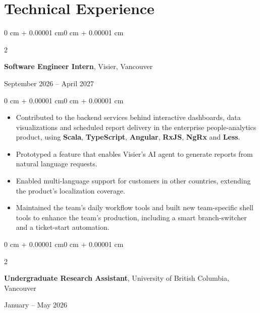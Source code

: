\documentclass[10pt, letterpaper]{article}
\newenvironment{highlights}{
    \begin{itemize}[
        topsep=0.10 cm,
        parsep=0.10 cm,
        partopsep=0pt,
        itemsep=0pt,
        leftmargin=0 cm + 10pt
    ]
}{
    \end{itemize}
}
\newenvironment{onecolentry}{
    \begin{adjustwidth}{0 cm + 0.00001 cm}{0 cm + 0.00001 cm}
}{
    \end{adjustwidth}
}
\newenvironment{twocolentry}[2][]{
    \onecolentry
    \def\secondColumn{#2}
    \setcolumnwidth{\fill, 4.5 cm}
    \begin{paracol}{2}
}{
    \switchcolumn \raggedleft \secondColumn
    \end{paracol}
    \endonecolentry
}
\begin{document}
    \vspace{0.05 cm}

    \section{Technical Experience}

    \vspace{0.20 cm}
    
    \begin{twocolentry}{September 2026 -- April 2027}
        \textbf{Software Engineer Intern}, Visier, Vancouver
    \end{twocolentry}
    
    \vspace{0.10 cm}
    \begin{onecolentry}
        \begin{highlights}
            \item Contributed to the backend services behind interactive dashboards, data visualizations 
            and scheduled report delivery in the enterprise people-analytics product,
            using \textbf{Scala}, \textbf{TypeScript}, \textbf{Angular}, \textbf{RxJS}, \textbf{NgRx} and \textbf{Less}.
            \item Prototyped a feature that enables Visier's AI agent to generate reports from natural language requests.
            \item Enabled multi-language support for customers in other countries, extending the product's localization coverage.
            \item Maintained the team's daily workflow tools and built new team-specific shell tools to enhance the team's production, 
            including a smart branch-switcher and a ticket-start automation.
        \end{highlights}
    \end{onecolentry}

    \vspace{0.20 cm}

    \begin{twocolentry}{January -- May 2026}
        \textbf{Undergraduate Research Assistant}, University of British Columbia, Vancouver
    \end{twocolentry}
    
\end{document}
